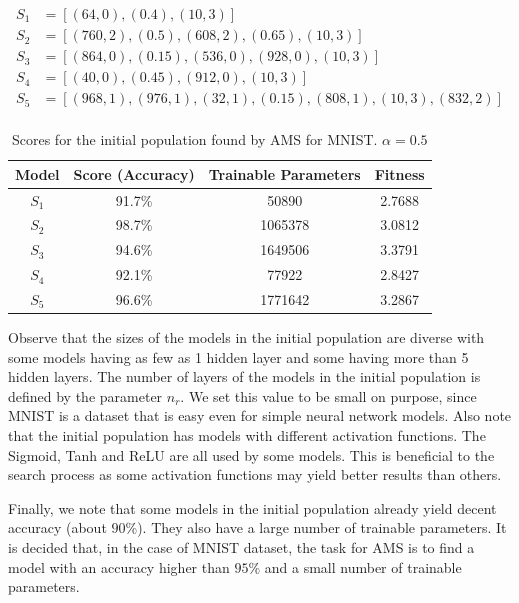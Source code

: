 \documentclass[12pt]{elsart}%
\begin{document}
\begin{align*}
S_1 & = \left[ (64, 0), (0.4), (10, 3) \right] \\
S_2 & = \left[ (760, 2), (0.5), (608, 2), (0.65), (10, 3) \right] \\
S_3 & = \left[ (864, 0), (0.15), (536, 0), (928, 0), (10, 3) \right] \\
S_4 & = \left[ (40,0), (0.45), (912, 0), (10, 3) \right] \\
S_5 & = \left[ (968, 1), (976, 1), (32, 1), (0.15), (808, 1), (10, 3), (832, 2) \right] \\
\end{align*}

\begin{table}[!htb]
\begin{center}
\caption{Scores for the initial population found by AMS for MNIST. $\alpha = 0.5$}
\label{table:ams_mnist_initial}
\vspace{12pt}
\begin{tabular}{| c | c | c | c |}
\hline
Model & Score (Accuracy) & Trainable Parameters & Fitness\\
\hline
$S_1$ & 91.7\% & 50890 & 2.7688\\
$S_2$ & 98.7\% & 1065378 & 3.0812\\
$S_3$ & 94.6\% & 1649506 & 3.3791\\
$S_4$ & 92.1\% & 77922 & 2.8427\\
$S_5$ & 96.6\% & 1771642 & 3.2867\\
\hline
\end{tabular}
\end{center}
\end{table} 

Observe that the sizes of the models in the initial population are diverse with some models having as few as 1 hidden layer and some having more than 5 hidden layers. The number of layers of the models in the initial population is defined by the parameter $n_r$. We set this value to be small on purpose, since MNIST is a dataset that is easy even for simple neural network models. Also note that the initial population has models with different activation functions. The Sigmoid, Tanh and ReLU are all used by some models. This is beneficial to the search process as some activation functions may yield better results than others.

Finally, we note that some models in the initial population already yield decent accuracy (about $90\%$). They also have a large number of trainable parameters. It is decided that, in the case of MNIST dataset, the task for AMS is to find a model with an accuracy higher than $95\%$ and a small number of trainable parameters.
\end{document}
